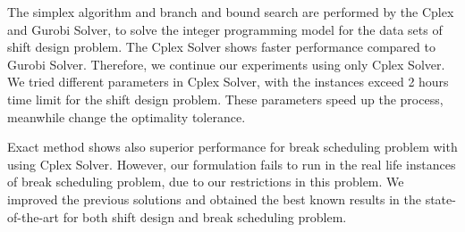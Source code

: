 The simplex algorithm and branch and bound search are performed by the Cplex and Gurobi Solver, to solve the integer programming model for the data sets of shift design problem. The Cplex Solver shows faster performance compared to Gurobi Solver. Therefore, we continue our experiments using only Cplex Solver. We tried different parameters in Cplex Solver, with the instances exceed 2 hours time limit for the shift design problem. These parameters speed up the process, meanwhile change the optimality tolerance. 

Exact method shows also superior performance for break scheduling problem with using Cplex Solver. However, our formulation fails to run in the real life instances of break scheduling problem, due to our restrictions in this problem. We improved the previous solutions and obtained the best known results in the state-of-the-art for both shift design and break scheduling problem. 

